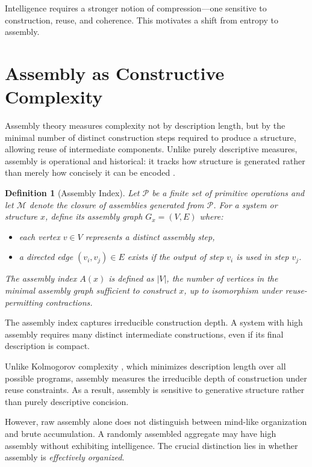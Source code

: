 \documentclass[11pt,letterpaper]{article}
\newtheorem{definition}{Definition}
\begin{document}
Intelligence requires a stronger notion of compression—one sensitive to construction, reuse, and coherence. This motivates a shift from entropy to assembly.

\section{Assembly as Constructive Complexity}

Assembly theory measures complexity not by description length, but by the minimal number of distinct construction steps required to produce a structure, allowing reuse of intermediate components. Unlike purely descriptive measures, assembly is operational and historical: it tracks how structure is generated rather than merely how concisely it can be encoded \parencite{walker2022}.

\begin{definition}[Assembly Index]
Let $\mathcal{P}$ be a finite set of primitive operations and let $\mathcal{M}$ denote the closure of assemblies generated from $\mathcal{P}$. For a system or structure $x$, define its \emph{assembly graph} $G_x = (V,E)$ where:
\begin{itemize}
\item each vertex $v \in V$ represents a distinct assembly step,
\item a directed edge $(v_i,v_j) \in E$ exists if the output of step $v_i$ is used in step $v_j$.
\end{itemize}
The assembly index $A(x)$ is defined as $|V|$, the number of vertices in the minimal assembly graph sufficient to construct $x$, up to isomorphism under reuse-permitting contractions.
\end{definition}

The assembly index captures irreducible construction depth. A system with high assembly requires many distinct intermediate constructions, even if its final description is compact.

Unlike Kolmogorov complexity \parencite{kolmogorov1965}, which minimizes description length over all possible programs, assembly measures the irreducible depth of construction under reuse constraints. As a result, assembly is sensitive to generative structure rather than purely descriptive concision.

However, raw assembly alone does not distinguish between mind-like organization and brute accumulation. A randomly assembled aggregate may have high assembly without exhibiting intelligence. The crucial distinction lies in whether assembly is \emph{effectively organized}.
\end{document}
